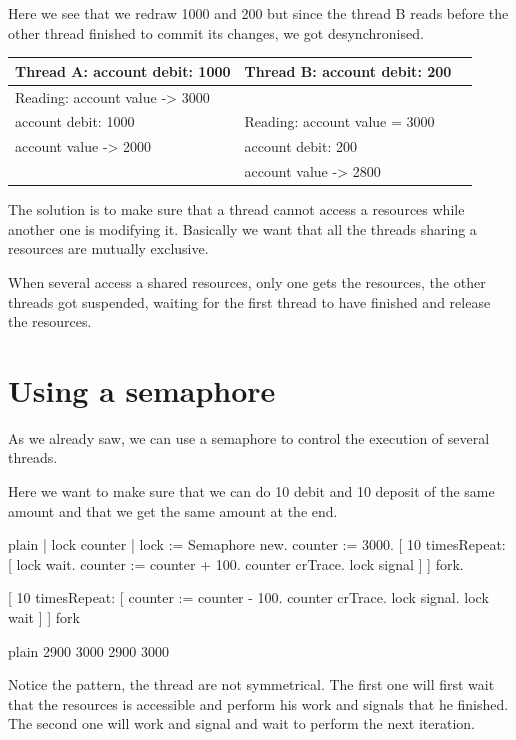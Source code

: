 \documentclass[10pt,twoside,english]{_support/latex/sbabook/sbabook}
\begin{document}
Here we see that we redraw 1000 and 200 but since the thread B reads before 
the other thread finished to commit its changes, we got desynchronised.

\begin{tabular}{lll}
\toprule
\textbf{Thread A: account debit: 1000} & \textbf{Thread B: account debit: 200} &  \\
\midrule
Reading: account value -\textgreater{} 3000 &  &  \\
account debit: 1000 & Reading: account value = 3000 &  \\
account value -\textgreater{} 2000 & account debit: 200 &  \\
 & account value -\textgreater{} 2800 \\
\bottomrule
\end{tabular}

The solution is to make sure that a thread cannot access a resources while another one is modifying it. Basically we want that all the threads sharing a resources are mutually exclusive. 

When several access a shared resources, only one gets the resources, the other threads got suspended, waiting for the first thread to have finished and release the resources.
\section{Using a semaphore}
As we already saw, we can use a semaphore to control the execution of several threads. 

Here we want to make sure that we can do 10 debit and 10 deposit of the same amount and that we get the same amount at the end. 

\begin{displaycode}{plain}
| lock counter |
lock := Semaphore new.
counter := 3000.
[ 10 timesRepeat: [
	lock wait.
	counter := counter + 100.
	counter crTrace.
	lock signal ]
	] fork.
	
[ 10 timesRepeat: [
	counter := counter - 100.
	counter crTrace. 
	lock signal. 
	lock wait ]
	] fork
\end{displaycode}

\begin{displaycode}{plain}
2900
3000
2900
3000
\end{displaycode}

Notice the pattern, the thread are not symmetrical. 
The first one will first wait that the resources is accessible and perform his work 
and signals that he finished. 
The second one will work and signal and wait to perform the next iteration.
\end{document}
